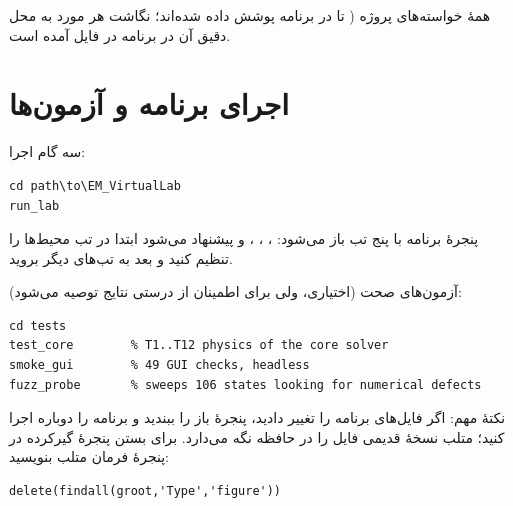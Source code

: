 \documentclass[12pt,a4paper]{article}
\begin{document}
همۀ خواسته‌های پروژه ( تا  در برنامه پوشش داده شده‌اند؛ نگاشت هر مورد به محل دقیق آن در برنامه در فایل  آمده است.

\section{اجرای برنامه و آزمون‌ها}

سه گام اجرا:
\begin{latin}
\begin{verbatim}
cd path\to\EM_VirtualLab
run_lab
\end{verbatim}
\end{latin}

پنجرۀ برنامه با پنج تب باز می‌شود: ، ، ،  و  پیشنهاد می‌شود ابتدا در تب  محیط‌ها را تنظیم کنید و بعد به تب‌های دیگر بروید.

آزمون‌های صحت (اختیاری، ولی برای اطمینان از درستی نتایج توصیه می‌شود):
\begin{latin}
\begin{verbatim}
cd tests
test_core        % T1..T12 physics of the core solver
smoke_gui        % 49 GUI checks, headless
fuzz_probe       % sweeps 106 states looking for numerical defects
\end{verbatim}
\end{latin}

نکتۀ مهم: اگر فایل‌های برنامه را تغییر دادید، پنجرۀ باز را ببندید و برنامه را دوباره اجرا کنید؛ متلب نسخۀ قدیمی فایل را در حافظه نگه می‌دارد. برای بستن پنجرۀ گیرکرده در پنجرۀ فرمان متلب بنویسید:
\begin{latin}
\begin{verbatim}
delete(findall(groot,'Type','figure'))
\end{verbatim}
\end{latin}
\end{document}
